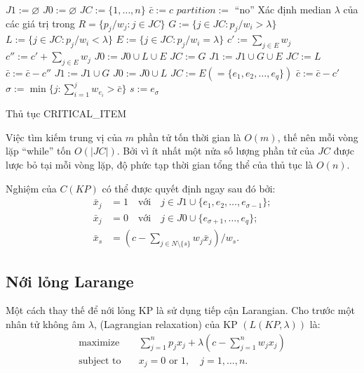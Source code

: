 \begin{algorithm}[!ht]
\DontPrintSemicolon
    \vspace{1em}
    \vspace{1em}
    $J1 := \varnothing$\;
    $J0 := \varnothing$\;
    $JC := \{1, \dots, n\}$\;
    $\bar{c} := c$\;
    $partition := $ ``no''\;
    {
        Xác định median $\lambda$ của các giá trị trong $R = \{p_j/w_j : j \in JC\}$\;
        $G := \{j \in JC: p_j/w_i > \lambda\}$\;
        $L := \{j \in JC: p_j/w_i < \lambda\}$\;
        $E := \{j \in JC: p_j/w_i = \lambda\}$\;
        $c':=\sum_{j\in E}w_j$\;
        $c'':= c' + \sum_{j\in E}w_j$\;
        {
            $J0:=J0\cup L \cup E$\;
            $JC := G$\;
        }
        \Else
        {
            $J1:=J1\cup G \cup E$\;
            $JC := L$\;
            $\bar{c} := \bar{c} - c''$\;
        }
    }
    $J1 := J1 \cup G$\;
    $J0 := J0 \cup L$\;
    $JC := E (=\{e_1, e_2, \dots, e_q\})$\;
    $\bar{c} := \bar{c} - c'$\;
    $\sigma := \min\{j:\sum_{i=1}^jw_{e_i} > \bar{c}\}$\;
    $s:= e_\sigma$\;
    \caption{Thủ tục CRITICAL\_ITEM}
\end{algorithm}

Việc tìm kiếm trung vị của $m$ phần tử tốn thời gian là $O(m)$, thế nên mỗi vòng lặp ``while'' tốn $O(|JC|)$. Bởi vì ít nhất một nửa số lượng phần tử của $JC$ được lược bỏ tại mỗi vòng lặp, độ phức tạp thời gian tổng thể của thủ tục là $O(n)$.

Nghiệm của $C(KP)$ có thể được quyết định ngay sau đó bởi:
\begin{align}
    \bar{x}_j &= 1\quad \text{với}\quad j \in J1 \cup \{e_1, e_2, \dots, e_{\sigma - 1}\};\\
    \bar{x}_j &= 0\quad \text{với}\quad j \in J0 \cup \{e_{\sigma+1}, \dots, e_{q}\};\\
    \bar{x}_s &= \left(c - \sum_{j \in N \setminus \{s\}}w_j\bar{x}_j\right) / w_s.
\end{align}

\subsection{Nới lỏng Larange}

Một cách thay thế để nới lỏng KP là sử dụng tiếp cận Larangian. Cho trước một nhân tử không âm $\lambda$,  (Lagrangian relaxation) của KP $(L(KP, \lambda))$ là:
\begin{align}
    \label{eq:larangian_relaxation}
    \text{maximize}\quad&\sum_{j = 1}^np_jx_j  + \lambda\left(c - \sum_{j=1}^nw_jx_j\right)\\
     \text{subject to}\quad &  x_j = 0 \text{ or } 1, \quad j = 1, \dots, n.
\end{align}

